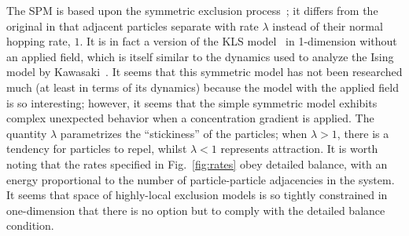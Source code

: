 The SPM is based upon the symmetric exclusion process~\cite{sugden2007dynamically, Kollmann2003,  Lin2005, Hegde2014, Krapivsky2014, Imamura2017};
it differs from the original in that adjacent particles separate with rate $\lambda$
instead of their normal hopping rate, $1$. It is in fact a version of the KLS model~\cite{Katz1984, Zia2010} in 1-dimension without an applied field, which is itself similar to the dynamics used to analyze the Ising model by
Kawasaki~\cite{PhysRev.145.224}. It seems that this symmetric model has not been researched much (at least in terms of its dynamics) because the model with the applied field is so interesting; however, it seems that the simple symmetric model
exhibits complex unexpected behavior when a concentration gradient is applied. The quantity $\lambda$ parametrizes the ``stickiness'' of the particles; when $\lambda>1$, there is a tendency for particles to repel,
whilst $\lambda < 1$ represents attraction.
It is worth noting that the rates specified in Fig.~\ref{fig:rates} obey detailed balance,  %
with an energy proportional to the number of particle-particle adjacencies
in the system. It seems that space of highly-local exclusion models is so tightly constrained in one-dimension that there is no option but to comply with the detailed balance condition.


